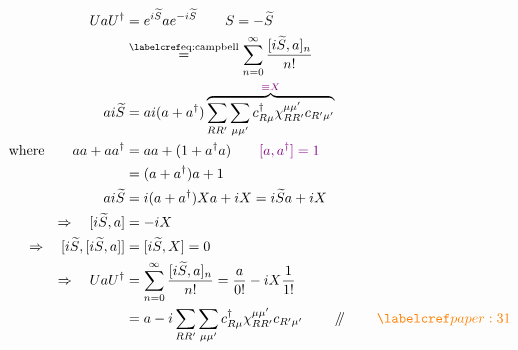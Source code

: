 \begin{align*}
UaU^\dagger
 &=e^{i\widetilde S}a e^{-i\widetilde S}\qquad S=-\widetilde S\\
 &\stepref{eq:campbell}\sum_{n=0}^\infty\frac{[i\widetilde S,a]_n}{n!}\\
ai\widetilde S
 &=ai(a+a^\dagger)\overbrace{\sum_{RR'}\sum_{\mu\mu'}
       c^\dagger_{R\mu}\chi_{RR'}^{\mu\mu'}c_{R'\mu'}}
       ^{\annotation{\equiv X}}\\
\text{where}\qquad aa+aa^\dagger
 &=aa+(1+a^\dagger a)\qquad \annotation{[a,a^\dagger]=1}\\
 &=(a+a^\dagger)a+1\\
ai\widetilde S
 &=i(a+a^\dagger)Xa+iX=i\widetilde Sa+iX\\
\Rightarrow\quad[i\widetilde S,a]&=-iX\\
\Rightarrow\quad[i\widetilde S,[i\widetilde S,a]]
 &=[i\widetilde S,X]=0\\
\Rightarrow\quad UaU^\dagger
 &=\sum_{n=0}^\infty\frac{[i\widetilde S,a]_n}{n!}
    =\frac{a}{0!}-iX\frac{1}{1!}\\
 &=a-i\sum_{RR'}\sum_{\mu\mu'}
     c^\dagger_{R\mu}\chi_{RR'}^{\mu\mu'}c_{R'\mu'}
       \qquad\done\qquad\paperref{paper:31}
\end{align*}

